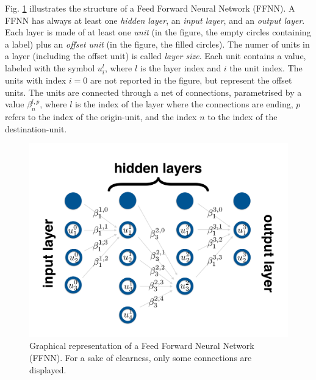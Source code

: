 \documentclass[11pt,a4paper,twoside]{article}
\begin{document}
Fig. \ref{fig:FFNN} illustrates the structure of a Feed Forward Neural Network (FFNN).
A FFNN has always at least one \emph{hidden layer}, an \emph{input layer}, and an \emph{output layer}.
Each layer is made of at least one \emph{unit} (in the figure, the empty circles containing a label) plus an \emph{offset unit} (in the figure, the filled circles).
The numer of units in a layer (including the offset unit) is called \emph{layer size}.
Each unit contains a value, labeled with the symbol $u^l_i$, where $l$ is the layer index and $i$ the unit index.
The units with index $i=0$ are not reported in the figure, but represent the offset units.
The units are connected through a net of connections, parametrised by a value $\beta^{l,p}_n$, where $l$ is the index of the layer where the connections are ending, $p$ refers to the index of the origin-unit, and the index $n$ to the index of the destination-unit. 

\begin{figure}[htpb]
  \centering
    \includegraphics[width=.9\textwidth]{FFNN.pdf}
  \caption{Graphical representation of a Feed Forward Neural Network (FFNN). For a sake of clearness, only some connections are displayed.}
  \label{fig:FFNN}
\end{figure}
\end{document}
